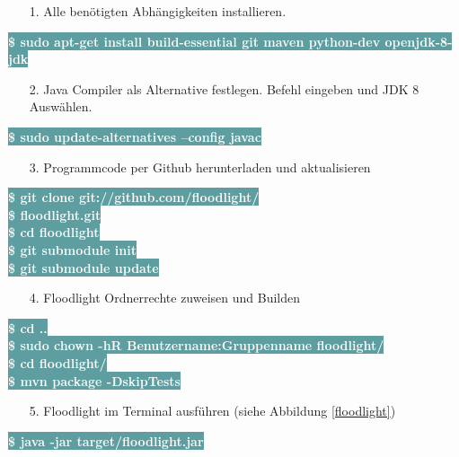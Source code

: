 \documentclass[fontsize=12pt,paper=a4,open=any,parskip=half,
  twoside=false,toc=listof,toc=bibliography,fleqn,leqno,
  captions=nooneline,captions=tableabove,british]{scrbook}
\begin{document}
\begin{itemize}
\item[1.] Alle benötigten Abhängigkeiten installieren.
\end{itemize}
\colorbox{CadetBlue}{\textcolor{white}{\textbf{\textsf{\$ sudo apt-get install build-essential git maven python-dev openjdk-8-jdk}}}}
\begin{itemize}
\item[2.] Java Compiler als Alternative festlegen. Befehl eingeben und JDK 8 Auswählen.
\end{itemize}
\colorbox{CadetBlue}{\textcolor{white}{\textbf{\textsf{\$ sudo update-alternatives --config javac}}}}
\begin{itemize}
\item[3.] Programmcode per Github herunterladen und aktualisieren
\end{itemize}
\colorbox{CadetBlue}{\textcolor{white}{\textbf{\textsf{\$ git clone git://github.com/floodlight/}}}}\\
\colorbox{CadetBlue}{\textcolor{white}{\textbf{\textsf{\$ floodlight.git}}}}\\
\colorbox{CadetBlue}{\textcolor{white}{\textbf{\textsf{\$ cd floodlight}}}}\\
\colorbox{CadetBlue}{\textcolor{white}{\textbf{\textsf{\$ git submodule init}}}}\\
\colorbox{CadetBlue}{\textcolor{white}{\textbf{\textsf{\$ git submodule update}}}}
\begin{itemize}
\item[4.] Floodlight Ordnerrechte zuweisen und Builden
\end{itemize}
\colorbox{CadetBlue}{\textcolor{white}{\textbf{\textsf{\$ cd ..}}}}\\
\colorbox{CadetBlue}{\textcolor{white}{\textbf{\textsf{\$ sudo chown -hR Benutzername:Gruppenname floodlight/}}}}\\
\colorbox{CadetBlue}{\textcolor{white}{\textbf{\textsf{\$ cd floodlight/}}}}\\
\colorbox{CadetBlue}{\textcolor{white}{\textbf{\textsf{\$ mvn package -DskipTests}}}}
\begin{itemize}
\item[5.] Floodlight im Terminal ausführen (siehe Abbildung \ref{floodlight})
\end{itemize}
\colorbox{CadetBlue}{\textcolor{white}{\textbf{\textsf{\$ java -jar target/floodlight.jar}}}}
\end{document}
